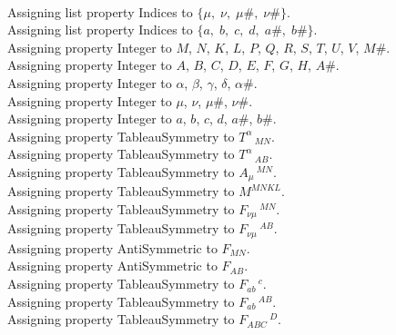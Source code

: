 \documentclass[11pt]{article}
\begin{document}
\\
Assigning list property Indices to $\{\mu,\; \nu,\; \mu\#,\; \nu\#\}$.
\\
Assigning list property Indices to $\{a,\; b,\; c,\; d,\; a\#,\; b\#\}$.
\\
Assigning property Integer to $M$, $N$, $K$, $L$, $P$, $Q$, $R$, $S$, $T$, $U$, $V$, $M\#$.
\\
Assigning property Integer to $A$, $B$, $C$, $D$, $E$, $F$, $G$, $H$, $A\#$.
\\
Assigning property Integer to $\alpha$, $\beta$, $\gamma$, $\delta$, $\alpha\#$.
\\
Assigning property Integer to $\mu$, $\nu$, $\mu\#$, $\nu\#$.
\\
Assigning property Integer to $a$, $b$, $c$, $d$, $a\#$, $b\#$.
\\
Assigning property TableauSymmetry to ${T}^{\alpha}\,_{M N}$.
\\
Assigning property TableauSymmetry to ${T}^{\alpha}\,_{A B}$.
\\
Assigning property TableauSymmetry to ${A}_{\mu}\,^{M N}$.
\\
Assigning property TableauSymmetry to ${M}^{M N K L}$.
\\
Assigning property TableauSymmetry to ${F}_{\nu \mu}\,^{M N}$.
\\
Assigning property TableauSymmetry to ${F}_{\nu \mu}\,^{A B}$.
\\
Assigning property AntiSymmetric to ${F}_{M N}$.
\\
Assigning property AntiSymmetric to ${F}_{A B}$.
\\
Assigning property TableauSymmetry to ${F}_{a b}\,^{c}$.
\\
Assigning property TableauSymmetry to ${F}_{a b}\,^{A B}$.
\\
Assigning property TableauSymmetry to ${F}_{A B C}\,^{D}$.
\end{document}
